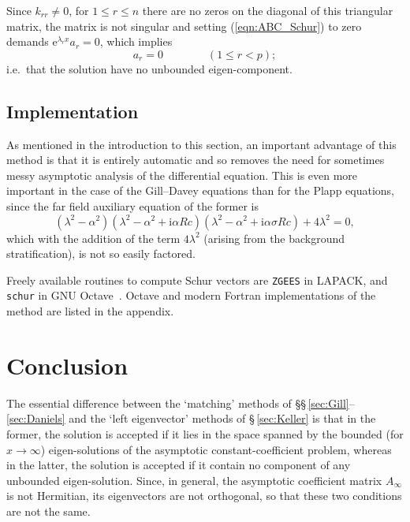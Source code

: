 \documentclass{article}
\begin{document}
Since $k_{rr}\not= 0$, for $1\leq r\leq n$ there are no zeros on the
diagonal of this triangular matrix, the matrix is not singular and
setting (\ref{eqn:ABC_Schur}) to zero demands $\mathrm{e}^{\lambda_r
x} a_r = 0$, which implies
\begin{equation}
a_r = 0 \qquad\qquad( 1\leq r < p);
\end{equation}
i.e.\ that the solution have no unbounded eigen-component.

\subsection{Implementation}

As mentioned in the introduction to this section, an important
advantage of this method is that it is entirely automatic and so
removes the need for sometimes messy asymptotic analysis of the
differential equation.  This is even more important in the case of the
Gill--Davey equations than for the Plapp equations, since the far
field auxiliary equation of the former is
\begin{equation}
(\lambda^2-\alpha^2)(\lambda^2-\alpha^2+\mathrm{i}\alpha R c)
(\lambda^2-\alpha^2+\mathrm{i}\alpha\sigma R c) + 4\lambda^2 = 0,
\end{equation}
which with the addition of the term $4\lambda^2$ (arising from the
background stratification), is not so easily factored.

Freely available routines to compute Schur vectors are \texttt{ZGEES}
in LAPACK, and \texttt{schur} in GNU Octave~\citep{Eaton02:GOM}.
Octave and modern Fortran implementations of the method are listed in
the appendix.

\section{Conclusion}

The essential difference between the `matching' methods of
\S\S\,\ref{sec:Gill}--\ref{sec:Daniels} and the `left eigenvector'
methods of \S\,\ref{sec:Keller} is that in the former, the solution is
accepted if it lies in the space spanned by the bounded (for
$x\rightarrow\infty$) eigen-solutions of the asymptotic
constant-coefficient problem, whereas in the latter, the solution is
accepted if it contain no component of any unbounded eigen-solution.
Since, in general, the asymptotic coefficient matrix $A_\infty$ is not
Hermitian, its eigenvectors are not orthogonal, so that these two
conditions are not the same.
\end{document}
